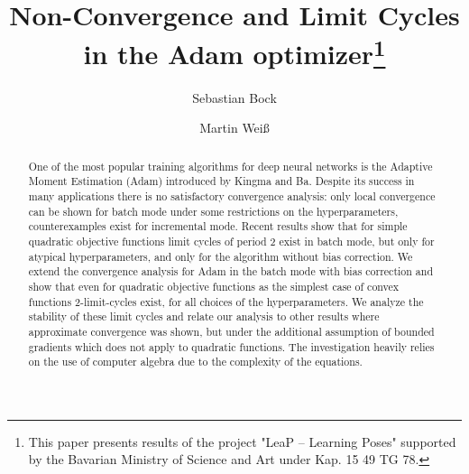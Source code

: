 \documentclass[runningheads]{llncs}
\begin{document}
%
\title{Non-Convergence and Limit Cycles in the Adam optimizer\thanks{This paper presents results of the project "LeaP – Learning Poses" supported by the Bavarian Ministry of Science and Art under Kap. 15 49 TG 78.}}
%
%
\author{Sebastian Bock\and
Martin Wei{\ss}}
%
%
%
\maketitle              %
%
\begin{abstract}
One of the most popular training algorithms for deep neural networks is the Adaptive Moment Estimation (Adam) introduced by Kingma and Ba. 
Despite its success in many applications there is no satisfactory 
convergence analysis: only local convergence can be shown for batch mode under some
restrictions on the hyperparameters, counterexamples
exist for incremental mode. Recent results show that for simple
quadratic objective functions limit cycles of period 2 exist in batch mode, 
but only for atypical hyperparameters, and only for the algorithm without bias correction. 
We extend the convergence analysis for Adam in the batch mode with bias correction
and show that
even for quadratic objective functions as the simplest case of convex functions
2-limit-cycles exist, for all choices of the hyperparameters. 
We analyze the stability of these limit cycles and relate our analysis to other
results where approximate convergence was shown, but under the additional assumption of
bounded gradients which does not apply to quadratic functions.
The investigation heavily relies on the use of computer algebra
due to the complexity of the equations.
\end{abstract}
%
%
\end{document}
